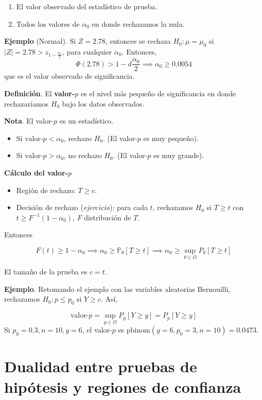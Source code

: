 \documentclass[
  12pt,
]{book}
\begin{document}
\begin{enumerate}
\def\labelenumi{\arabic{enumi})}
\item
  El valor observado del estadístico de prueba.
\item
  Todos los valores de \(\alpha_0\) en donde rechazamos la nula.
\end{enumerate}

\textbf{Ejemplo} (Normal). Si \(Z=2.78\), entonces se rechaza \(H_0: \mu = \mu_0\) si \(|Z| = 2.78>z_{1-\frac{\alpha_0}2}\), para cualquier \(\alpha_0\). Entonces,
\[\Phi(2.78) >1-d\frac{\alpha_0}2 \implies \alpha_0\geq 0.0054\]
que es el valor observado de significancia.

\textbf{Definición}. El \textbf{valor-\(p\)} es el nivel más pequeño de significancia en donde rechazaríamos \(H_0\) bajo los datos observados.

\textbf{Nota}. El valor-\(p\) es un estadístico.

\begin{itemize}
\item
  Si \(\text{valor-}p<\alpha_0\), rechazo \(H_0\). (El valor-\(p\) es muy pequeño).
\item
  Si \(\text{valor-}p>\alpha_0\), no rechazo \(H_0\). (El valor-\(p\) es muy grande).
\end{itemize}

\textbf{Cálculo del valor-\(p\)}

\begin{itemize}
\item
  Región de rechazo: \(T\geq c\).
\item
  Decisión de rechazo (\emph{ejercicio}): para cada \(t\), rechazamos \(H_0\) si \(T\geq t\) con \(t\geq F^{-1}(1-\alpha_0)\), \(F\) distribución de \(T\).
\end{itemize}

Entonces

\[F(t) \geq 1-\alpha_0 \implies \alpha_0 \geq \mathbb P_\theta[T\geq t] \implies \alpha_0 \geq \sup_{\theta\in\Omega}P_{\theta}[T\geq t]\]

El tamaño de la prueba es \(c=t\).

\textbf{Ejemplo}. Retomando el ejemplo con las variables aleatorias Bernouilli, rechazamos \(H_0: p\leq p_0\) si \(Y\geq c\). Así,

\[\text{valor-$p$} = \sup_{p\in\Omega}P_{p}[Y\geq y] =P_{p}[Y\geq y] \]
Si \(p_0 = 0.3, n=10, y =6\), el valor-\(p\) es \(\text{pbinom}(y = 6, p_0 =3,n=10) = 0.0473\).

\hypertarget{dualidad-entre-pruebas-de-hipuxf3tesis-y-regiones-de-confianza}{%
\section{Dualidad entre pruebas de hipótesis y regiones de confianza}\label{dualidad-entre-pruebas-de-hipuxf3tesis-y-regiones-de-confianza}}
\end{document}
